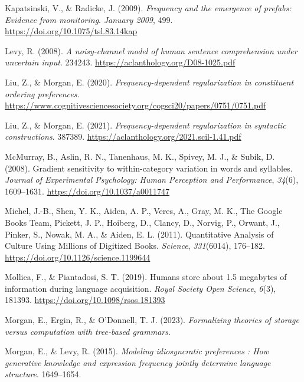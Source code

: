 \documentclass[
  12pt,
]{scrartcl}
\newlength{\cslhangindent}
\newenvironment{CSLReferences}[2] %
 {\begin{list}{}{%
  \setlength{\itemindent}{0pt}
  \setlength{\leftmargin}{0pt}
  \setlength{\parsep}{0pt}
  \ifodd #1
   \setlength{\leftmargin}{\cslhangindent}
   \setlength{\itemindent}{-1\cslhangindent}
  \fi
  \setlength{\itemsep}{#2\baselineskip}}}
 {\end{list}}
\begin{document}
\begin{CSLReferences}{1}{0}
Kapatsinski, V., \& Radicke, J. (2009). \emph{Frequency and the
emergence of prefabs: Evidence from monitoring}. \emph{January 2009},
499. \url{https://doi.org/10.1075/tsl.83.14kap}

Levy, R. (2008). \emph{A noisy-channel model of human sentence
comprehension under uncertain input}. 234243.
\url{https://aclanthology.org/D08-1025.pdf}

Liu, Z., \& Morgan, E. (2020). \emph{Frequency-dependent regularization
in constituent ordering preferences.}
\url{https://www.cognitivesciencesociety.org/cogsci20/papers/0751/0751.pdf}

Liu, Z., \& Morgan, E. (2021). \emph{Frequency-dependent regularization
in syntactic constructions}. 387389.
\url{https://aclanthology.org/2021.scil-1.41.pdf}

McMurray, B., Aslin, R. N., Tanenhaus, M. K., Spivey, M. J., \& Subik,
D. (2008). Gradient sensitivity to within-category variation in words
and syllables. \emph{Journal of Experimental Psychology: Human
Perception and Performance}, \emph{34}(6), 1609--1631.
\url{https://doi.org/10.1037/a0011747}

Michel, J.-B., Shen, Y. K., Aiden, A. P., Veres, A., Gray, M. K., The
Google Books Team, Pickett, J. P., Hoiberg, D., Clancy, D., Norvig, P.,
Orwant, J., Pinker, S., Nowak, M. A., \& Aiden, E. L. (2011).
Quantitative Analysis of Culture Using Millions of Digitized Books.
\emph{Science}, \emph{331}(6014), 176--182.
\url{https://doi.org/10.1126/science.1199644}

Mollica, F., \& Piantadosi, S. T. (2019). Humans store about 1.5
megabytes of information during language acquisition. \emph{Royal
Society Open Science}, \emph{6}(3), 181393.
\url{https://doi.org/10.1098/rsos.181393}

Morgan, E., Ergin, R., \& O'Donnell, T. J. (2023). \emph{Formalizing
theories of storage versus computation with tree-based grammars}.

Morgan, E., \& Levy, R. (2015). \emph{Modeling idiosyncratic preferences
: How generative knowledge and expression frequency jointly determine
language structure}. 1649--1654.


\end{CSLReferences}
\end{document}
